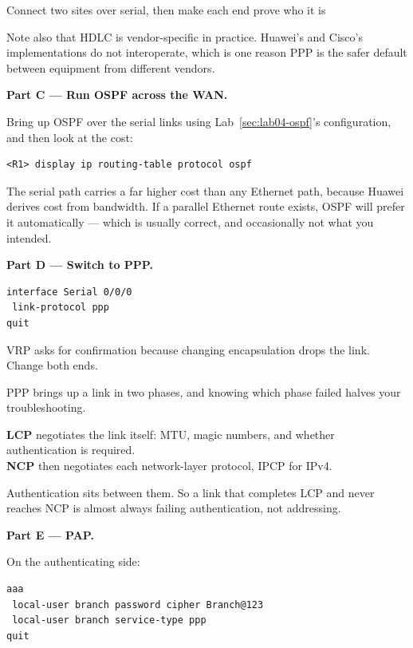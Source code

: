 \begin{labproject}{Connect two sites over serial, then make each end prove who it is}
\begin{pitfall}
Note also that HDLC is vendor-specific in practice. Huawei's and Cisco's implementations do not interoperate, which is one reason PPP is the safer default between equipment from different vendors.
\end{pitfall}

\medskip\noindent\textbf{Part C --- Run OSPF across the WAN.}\par
Bring up OSPF over the serial links using Lab~\ref{sec:lab04-ospf}'s configuration, and then look at the cost:

\begin{lstlisting}[style=dcnterminal]
<R1> display ip routing-table protocol ospf
\end{lstlisting}

The serial path carries a far higher cost than any Ethernet path, because Huawei derives cost from bandwidth. If a parallel Ethernet route exists, OSPF will prefer it automatically --- which is usually correct, and occasionally not what you intended.

\medskip\noindent\textbf{Part D --- Switch to PPP.}\par

\begin{lstlisting}[style=dcnterminal]
interface Serial 0/0/0
 link-protocol ppp
quit
\end{lstlisting}

VRP asks for confirmation because changing encapsulation drops the link. Change both ends.

\begin{keyidea}
PPP brings up a link in two phases, and knowing which phase failed halves your troubleshooting.

\textbf{LCP} negotiates the link itself: MTU, magic numbers, and whether authentication is required.\\
\textbf{NCP} then negotiates each network-layer protocol, IPCP for IPv4.

Authentication sits between them. So a link that completes LCP and never reaches NCP is almost always failing authentication, not addressing.
\end{keyidea}

\medskip\noindent\textbf{Part E --- PAP.}\par
On the authenticating side:

\begin{lstlisting}[style=dcnterminal]
aaa
 local-user branch password cipher Branch@123
 local-user branch service-type ppp
quit


\end{lstlisting}
\end{labproject}
